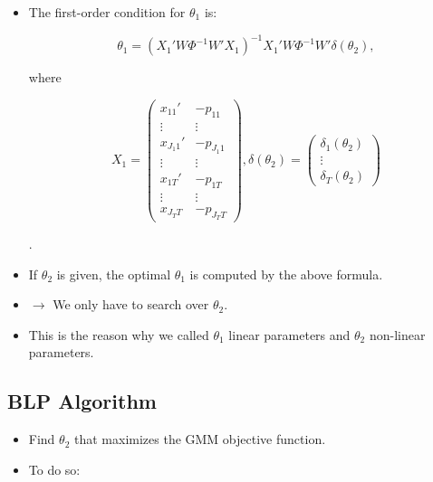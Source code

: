 \documentclass[]{book}
\providecommand{\tightlist}{%
  \setlength{\itemsep}{0pt}\setlength{\parskip}{0pt}}
\begin{document}
\begin{itemize}
\tightlist
\item
  The first-order condition for \(\theta_1\) is:

  \begin{equation}
  \theta_1 = (X_1'W \Phi^{-1} W'X_1)^{-1} X_1' W \Phi^{-1} W' \delta(\theta_2),
  \end{equation}

  where

  \begin{equation}
  X_1 = 
  \begin{pmatrix}
  x_{11}' & - p_{11}\\
  \vdots & \vdots \\
  x_{J_1 1}' & - p_{J_1 1}\\
  \vdots & \vdots \\
  x_{1T}' & - p_{1T}\\
  \vdots & \vdots \\
  x_{J_T T} & - p_{J_T T}
  \end{pmatrix},
  \delta(\theta_2) =
  \begin{pmatrix}
  \delta_1(\theta_2)\\
  \vdots\\
  \delta_T(\theta_2)
  \end{pmatrix}
  \end{equation}

  .
\item
  If \(\theta_2\) is given, the optimal \(\theta_1\) is computed by the
  above formula.
\item
  \(\rightarrow\) We only have to search over \(\theta_2\).
\item
  This is the reason why we called \(\theta_1\) linear parameters and
  \(\theta_2\) non-linear parameters.
\end{itemize}

\subsection{BLP Algorithm}\label{blp-algorithm}

\begin{itemize}
\tightlist
\item
  Find \(\theta_2\) that maximizes the GMM objective function.
\item
  To do so:
\end{itemize}
\end{document}

